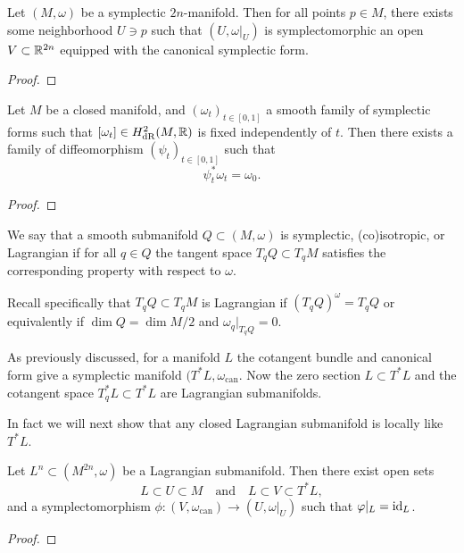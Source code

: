 \begin{thm*}[Darboux]
    Let $(M,\omega)$ be a symplectic $2n$-manifold.
    Then for all points $p\in M$, there exists some neighborhood $U\ni p$ such that $(U,\omega|_U)$ is symplectomorphic an open $V\subset\mathbb{R}^{2n}$ equipped with the canonical symplectic form.
\end{thm*}

\begin{proof}
\end{proof}

\begin{thm*}
    Let $M$ be a closed manifold, and $(\omega_t)_{t\in[0,1]}$ a smooth family of symplectic forms such that $[\omega_t]\in H^2_{\mathrm{dR}}(M,\mathbb{R})$ is fixed independently of $t$.
    Then there exists a family of diffeomorphism $(\psi_t)_{t\in[0,1]}$ such that
    \[\psi_t^*\omega_t=\omega_0.\]
\end{thm*}

\begin{proof}
\end{proof}

\begin{dfn}
    We say that a smooth submanifold $Q\subset(M,\omega)$ is symplectic, (co)isotropic, or Lagrangian if for all $q\in Q$ the tangent space $T_qQ\subset T_qM$ satisfies the corresponding property with respect to $\omega$.
\end{dfn}

Recall specifically that $T_qQ\subset T_qM$ is Lagrangian if $(T_qQ)^\omega=T_qQ$ or equivalently if $\dim Q=\dim M/2$ and $\omega_q|_{T_qQ}=0$.

\begin{example}
    As previously discussed, for a manifold $L$ the cotangent bundle and canonical form give a symplectic manifold $(T^*L,\omega_{\mathrm{can}}$.
    Now the zero section $L\subset T^*L$ and the cotangent space $T_q^*L\subset T^*L$ are Lagrangian submanifolds.
\end{example}

In fact we will next show that any closed Lagrangian submanifold is locally like $T^*L$.

\begin{thm*}
    Let $L^n\subset(M^{2n},\omega)$ be a Lagrangian submanifold.
    Then there exist open sets
    \[L\subset U\subset M\quad\text{and}\quad L\subset V\subset T^*L,\]
    and a symplectomorphism $\phi:(V,\omega_{\mathrm{can}})\to(U,\omega|_U)$ such that $\varphi|_L=\operatorname{id}_L$.
\end{thm*}

\begin{proof}
\end{proof}
